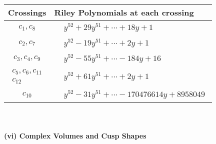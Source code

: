 \documentclass[1p]{elsarticle_modified}
\theoremstyle{definition}
\begin{document}
\begin{tabular}{m{50pt}|m{274pt}}
Crossings & \hspace{64pt}Riley Polynomials at each crossing \\
\hline $$\begin{aligned}c_{1},c_{8}\end{aligned}$$&$\begin{aligned}
&y^{52}+29 y^{51}+\cdots+18 y+1
\end{aligned}$\\
\hline $$\begin{aligned}c_{2},c_{7}\end{aligned}$$&$\begin{aligned}
&y^{52}-19 y^{51}+\cdots+2 y+1
\end{aligned}$\\
\hline $$\begin{aligned}c_{3},c_{4},c_{9}\end{aligned}$$&$\begin{aligned}
&y^{52}-55 y^{51}+\cdots-184 y+16
\end{aligned}$\\
\hline $$\begin{aligned}c_{5},c_{6},c_{11}\\c_{12}\end{aligned}$$&$\begin{aligned}
&y^{52}+61 y^{51}+\cdots+2 y+1
\end{aligned}$\\
\hline $$\begin{aligned}c_{10}\end{aligned}$$&$\begin{aligned}
&y^{52}-31 y^{51}+\cdots-170476614 y+8958049
\end{aligned}$\\
\hline
\end{tabular}\\~\\
\newpage\flushleft \textbf{(vi) Complex Volumes and Cusp Shapes}
\end{document}

